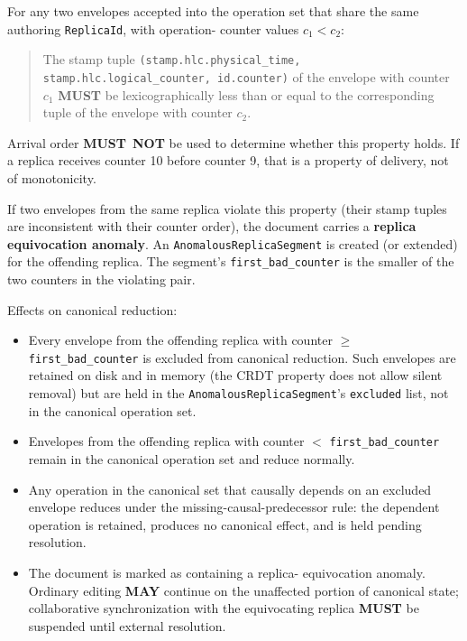 \documentclass[11pt,letterpaper]{report}
\newcounter{requirement}[chapter]
\newcommand{\MUST}{\textbf{MUST}}
\newcommand{\MUSTNOT}{\textbf{MUST}\nobreak\ \textbf{NOT}}
\newcommand{\MAY}{\textbf{MAY}}
\begin{document}
\begin{requirement}
  \label{req:semops:per-replica-hlc-monotonicity}
  For any two envelopes accepted into the operation set that
  share the same authoring \texttt{ReplicaId}, with operation-
  counter values $c_1 < c_2$:

  \begin{quote}
    The stamp tuple
    \texttt{(stamp.hlc.physical\_time, stamp.hlc.logical\_counter,
    id.counter)} of the envelope with counter $c_1$ \MUST{} be
    lexicographically less than or equal to the corresponding
    tuple of the envelope with counter $c_2$.
  \end{quote}

  Arrival order \MUSTNOT{} be used to determine whether this
  property holds. If a replica receives counter 10 before
  counter 9, that is a property of delivery, not of monotonicity.

  If two envelopes from the same replica violate this property
  (their stamp tuples are inconsistent with their counter order),
  the document carries a \textbf{replica equivocation anomaly}.
  An \texttt{AnomalousReplicaSegment} is created (or extended)
  for the offending replica. The segment's
  \texttt{first\_bad\_counter} is the smaller of the two
  counters in the violating pair.

  Effects on canonical reduction:

  \begin{itemize}
    \item Every envelope from the offending replica with counter
      $\geq$ \texttt{first\_bad\_counter} is excluded from
      canonical reduction. Such envelopes are retained on disk
      and in memory (the CRDT property does not allow silent
      removal) but are held in the
      \texttt{AnomalousReplicaSegment}'s \texttt{excluded} list,
      not in the canonical operation set.
    \item Envelopes from the offending replica with counter
      $<$ \texttt{first\_bad\_counter} remain in the canonical
      operation set and reduce normally.
    \item Any operation in the canonical set that causally
      depends on an excluded envelope reduces under the
      missing-causal-predecessor rule: the dependent operation
      is retained, produces no canonical effect, and is held
      pending resolution.
    \item The document is marked as containing a replica-
      equivocation anomaly. Ordinary editing \MAY{} continue on
      the unaffected portion of canonical state; collaborative
      synchronization with the equivocating replica \MUST{} be
      suspended until external resolution.
  \end{itemize}


\end{requirement}
\end{document}
